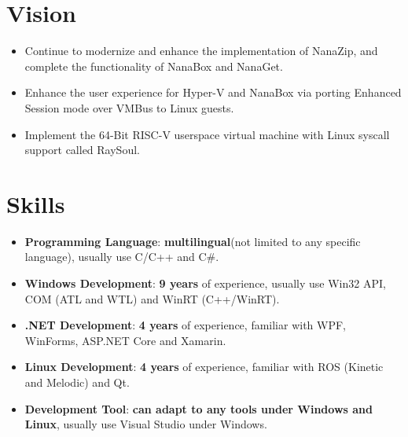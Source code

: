 \documentclass{resume}
\begin{document}
\section{Vision}
\begin{itemize}

  \item Continue to modernize and enhance the implementation of NanaZip, and complete the functionality of NanaBox and NanaGet.
  
  \item Enhance the user experience for Hyper-V and NanaBox via porting Enhanced Session mode over VMBus to Linux guests.
  
  \item Implement the 64-Bit RISC-V userspace virtual machine with Linux syscall support called RaySoul.
  
\end{itemize}

\section{Skills}
\begin{itemize}

  \item \textbf{Programming Language}:
    \textbf{multilingual}(not limited to any specific language), usually use C/C++ and C\#.

  \item \textbf{Windows Development}:
    \textbf{9 years} of experience, usually use Win32 API, COM (ATL and WTL) and WinRT (C++/WinRT).

  \item \textbf{.NET Development}:
    \textbf{4 years} of experience, familiar with WPF, WinForms, ASP.NET Core and Xamarin.
  
  \item \textbf{Linux Development}:
    \textbf{4 years} of experience, familiar with ROS (Kinetic and Melodic) and Qt.

  \item \textbf{Development Tool}:
    \textbf{can adapt to any tools under Windows and Linux}, usually use Visual Studio under Windows.

\end{itemize}
\end{document}
